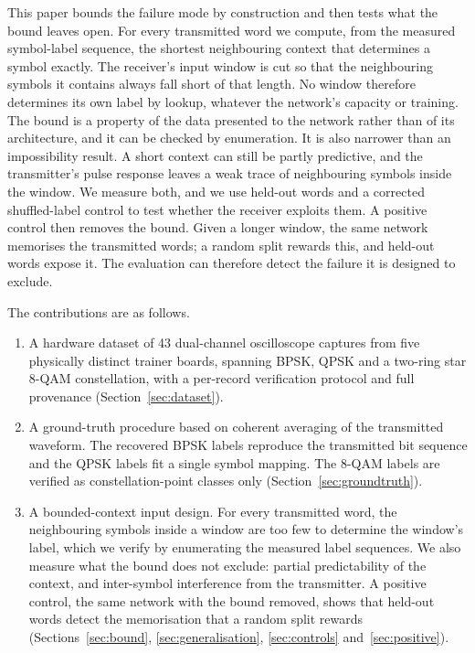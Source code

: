 \documentclass{ieeeaccess}
\begin{document}
This paper bounds the failure mode by construction and then tests what the
bound leaves open. For every transmitted word we compute, from the measured
symbol-label sequence, the shortest neighbouring context that determines a
symbol exactly. The receiver's input window is cut so that the neighbouring
symbols it contains always fall short of that length. No window therefore
determines its own label by lookup, whatever the network's capacity or
training. The bound is a property of the data presented to the network
rather than of its architecture, and it can be checked by enumeration. It is
also narrower than an impossibility result. A short context can still be
partly predictive, and the transmitter's pulse response leaves a weak trace
of neighbouring symbols inside the window. We measure both, and we use held-out
words and a corrected shuffled-label control to test whether the receiver
exploits them. A positive control then removes the bound. Given a longer
window, the same network memorises the transmitted words; a random split
rewards this, and held-out words expose it. The evaluation can therefore detect
the failure it is designed to exclude.

The contributions are as follows.

\begin{enumerate}
\item A hardware dataset of 43 dual-channel oscilloscope captures from five
physically distinct trainer boards, spanning BPSK, QPSK and a two-ring star
8-QAM constellation, with a per-record verification protocol and full
provenance (Section~\ref{sec:dataset}).
\item A ground-truth procedure based on coherent averaging of the transmitted
waveform. The recovered BPSK labels reproduce the transmitted bit sequence and
the QPSK labels fit a single symbol mapping. The 8-QAM labels are verified as
constellation-point classes only (Section~\ref{sec:groundtruth}).
\item A bounded-context input design. For every transmitted word, the
neighbouring symbols inside a window are too few to determine the window's
label, which we verify by enumerating the measured label sequences. We also
measure what the bound does not exclude: partial predictability of the
context, and inter-symbol interference from the transmitter. A positive
control, the same network with the bound removed, shows that held-out words
detect the memorisation that a random split rewards
(Sections~\ref{sec:bound}, \ref{sec:generalisation}, \ref{sec:controls}
and~\ref{sec:positive}).
\end{enumerate}
\end{document}
